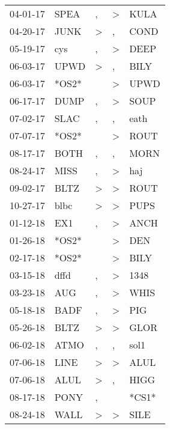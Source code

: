 \begin{supertabular}{lllll}
 04-01-17 &   SPEA &                , &     \textgreater &   KULA \\
 04-20-17 &   JUNK &     \textgreater &                , &   COND \\
 05-19-17 &    cys &                , &     \textgreater &   DEEP \\
 06-03-17 &   UPWD &     \textgreater &                , &   BILY \\
 06-03-17 &  *OS2* &                  &     \textgreater &   UPWD \\
 06-17-17 &   DUMP &                , &     \textgreater &   SOUP \\
 07-02-17 &   SLAC &                , &                , &   eath \\
 07-07-17 &  *OS2* &                  &     \textgreater &   ROUT \\
 08-17-17 &   BOTH &                , &                , &   MORN \\
 08-24-17 &   MISS &                , &     \textgreater &    haj \\
 09-02-17 &   BLTZ &     \textgreater &     \textgreater &   ROUT \\
 10-27-17 &   blbc &     \textgreater &     \textgreater &   PUPS \\
 01-12-18 &    EX1 &                , &     \textgreater &   ANCH \\
 01-26-18 &  *OS2* &                  &     \textgreater &    DEN \\
 02-17-18 &  *OS2* &                  &     \textgreater &   BILY \\
 03-15-18 &   dffd &                , &     \textgreater &   1348 \\
 03-23-18 &    AUG &                , &     \textgreater &   WHIS \\
 05-18-18 &   BADF &                , &     \textgreater &    PIG \\
 05-26-18 &   BLTZ &     \textgreater &     \textgreater &   GLOR \\
 06-02-18 &   ATMO &                , &                , &   sol1 \\
 07-06-18 &   LINE &     \textgreater &     \textgreater &   ALUL \\
 07-06-18 &   ALUL &     \textgreater &                , &   HIGG \\
 08-17-18 &   PONY &                , &                  &  *CS1* \\
 08-24-18 &   WALL &     \textgreater &     \textgreater &   SILE \\

\end{supertabular}
